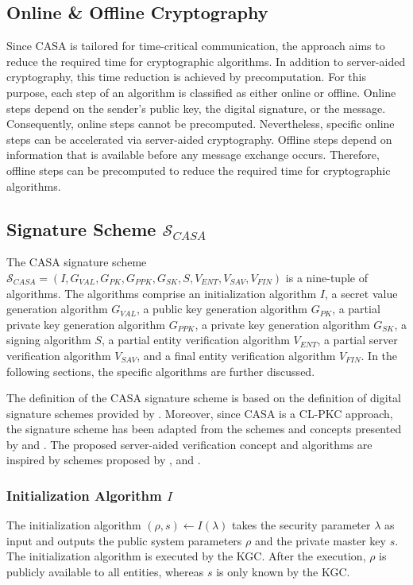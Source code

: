 \subsection{Online \& Offline Cryptography}
Since CASA is tailored for time-critical communication, the approach aims to reduce the required time for cryptographic algorithms.
In addition to server-aided cryptography, this time reduction is achieved by precomputation.
For this purpose, each step of an algorithm is classified as either online or offline.
Online steps depend on the sender's public key, the digital signature, or the message.
Consequently, online steps cannot be precomputed.
Nevertheless, specific online steps can be accelerated via server-aided cryptography.
Offline steps depend on information that is available before any message exchange occurs.
Therefore, offline steps can be precomputed to reduce the required time for cryptographic algorithms.

\subsection{Signature Scheme $\mathcal{S}_{CASA}$}
The CASA signature scheme $\mathcal{S}_{CASA} = (I, G_{VAL}, G_{PK}, G_{PPK}, G_{SK}, S, V_{ENT}, V_{SAV}, V_{FIN})$ is a nine-tuple of algorithms.
The algorithms comprise an initialization algorithm $I$, a secret value generation algorithm $G_{VAL}$, a public key generation algorithm $G_{PK}$, a partial private key generation algorithm $G_{PPK}$, a private key generation algorithm $G_{SK}$, a signing algorithm $S$, a partial entity verification algorithm $V_{ENT}$, a partial server verification algorithm $V_{SAV}$, and a final entity verification algorithm $V_{FIN}$.
In the following sections, the specific algorithms are further discussed.

The definition of the CASA signature scheme is based on the definition of digital signature schemes provided by \citeauthor{Boneh2023} \cite{Boneh2023}.
Moreover, since CASA is a CL-PKC approach, the signature scheme has been adapted from the schemes and concepts presented by \citeauthor{AlRiyami2003} \cite{AlRiyami2003} and \citeauthor{Ramadan2023} \cite{Ramadan2023}.
The proposed server-aided verification concept and algorithms are inspired by schemes proposed by \citeauthor{Ramadan2020} \cite{Ramadan2020}, \citeauthor{Girault2005} \cite{Girault2005} and \citeauthor{Wu2008} \cite{Wu2008}.

\subsubsection{Initialization Algorithm $I$}
The initialization algorithm $(\rho, s) \leftarrow I(\lambda)$ takes the security parameter $\lambda$ as input and outputs the public system parameters $\rho$ and the private master key $s$.
The initialization algorithm is executed by the KGC.
After the execution, $\rho$ is publicly available to all entities, whereas $s$ is only known by the KGC.


